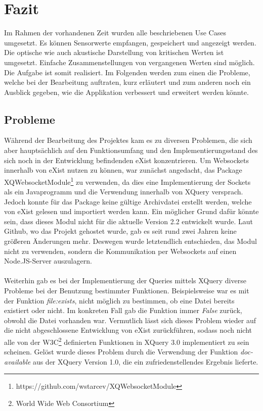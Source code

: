 \section{Fazit}
\label{sec:Fazit}
Im Rahmen der vorhandenen Zeit wurden alle beschriebenen Use Cases umgesetzt. Es können Sensorwerte empfangen, gespeichert und angezeigt werden. Die optische wie auch akustische Darstellung von kritischen Werten ist umgesetzt. Einfache Zusammenstellungen von vergangenen Werten sind möglich.\\
Die Aufgabe ist somit realisiert. Im Folgenden werden zum einen die Probleme, welche bei der Bearbeitung auftraten, kurz erläutert und zum anderen noch ein Ausblick gegeben, wie die Applikation verbessert und erweitert werden könnte.


\subsection{Probleme}
\label{subsec:Probleme}
Während der Bearbeitung des Projektes kam es zu diversen Problemen, die sich aber hauptsächlich auf den Funktionsumfang und den Implementierungsstand des sich noch in der Entwicklung befindenden eXist konzentrieren. Um Websockets innerhalb von eXist nutzen zu können, war zunächst angedacht, das Package XQWebsocketModule\footnote[1]{https://github.com/wstarcev/XQWebsocketModule} zu verwenden, da dies eine Implementierung der Sockets als ein Javaprogramm und die Verwendung innerhalb von XQuery versprach. Jedoch konnte für das Package keine gültige Archivdatei erstellt werden, welche von eXist gelesen und importiert werden kann. Ein möglicher Grund dafür könnte sein, dass dieses Modul nicht für die aktuelle Version 2.2 entwickelt wurde. Laut Github, wo das Projekt gehostet wurde, gab es seit rund zwei Jahren keine größeren Änderungen mehr. Deswegen wurde letztendlich entschieden, das Modul nicht zu verwenden, sondern die Kommunikation per Websockets auf einen Node.JS-Server auszulagern.
\\
\\
Weiterhin gab es bei der Implementierung der Queries mittels XQuery diverse Probleme bei der Benutzung bestimmter Funktionen. Beispielsweise war es mit der Funktion \textit{file:exists}, nicht möglich zu bestimmen, ob eine Datei bereits existiert oder nicht. Im konkreten Fall gab die Funktion immer \textit{False} zurück, obwohl die Datei vorhanden war. Vermutlich lässt sich dieses Problem wieder auf die nicht abgeschlossene Entwicklung von eXist zurückführen, sodass noch nicht alle von der W3C\footnote[2]{World Wide Web Consortium} definierten Funktionen in XQuery 3.0 implementiert zu sein scheinen. Gelöst wurde dieses Problem durch die Verwendung der Funktion \textit{doc-available} aus der XQuery Version 1.0, die ein zufriedenstellendes Ergebnis lieferte.

